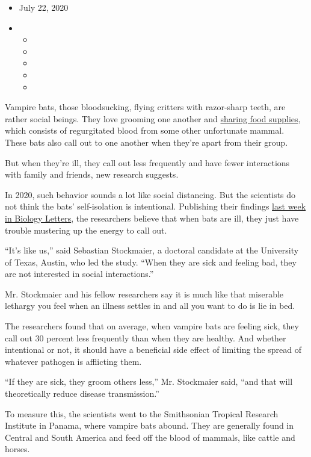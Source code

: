 \begin{itemize}
\item
  July 22, 2020
\item
  \begin{itemize}
  \item
  \item
  \item
  \item
  \item
  \end{itemize}
\end{itemize}

Vampire bats, those bloodsucking, flying critters with razor-sharp
teeth, are rather social beings. They love grooming one another and
\href{https://www.nytimes3xbfgragh.onion/2020/03/19/science/vampire-bats-blood.html}{sharing
food supplies}, which consists of regurgitated blood from some other
unfortunate mammal. These bats also call out to one another when they're
apart from their group.

But when they're ill, they call out less frequently and have fewer
interactions with family and friends, new research suggests.

In 2020, such behavior sounds a lot like social distancing. But the
scientists do not think the bats' self-isolation is intentional.
Publishing their findings
\href{https://royalsocietypublishing.org/doi/10.1098/rsbl.2020.0272}{last
week in Biology Letters}, the researchers believe that when bats are
ill, they just have trouble mustering up the energy to call out.

``It's like us,'' said Sebastian Stockmaier, a doctoral candidate at the
University of Texas, Austin, who led the study. ``When they are sick and
feeling bad, they are not interested in social interactions.''

Mr. Stockmaier and his fellow researchers say it is much like that
miserable lethargy you feel when an illness settles in and all you want
to do is lie in bed.

The researchers found that on average, when vampire bats are feeling
sick, they call out 30 percent less frequently than when they are
healthy. And whether intentional or not, it should have a beneficial
side effect of limiting the spread of whatever pathogen is afflicting
them.

``If they are sick, they groom others less,'' Mr. Stockmaier said, ``and
that will theoretically reduce disease transmission.''

To measure this, the scientists went to the Smithsonian Tropical
Research Institute in Panama, where vampire bats abound. They are
generally found in Central and South America and feed off the blood of
mammals, like cattle and horses.

